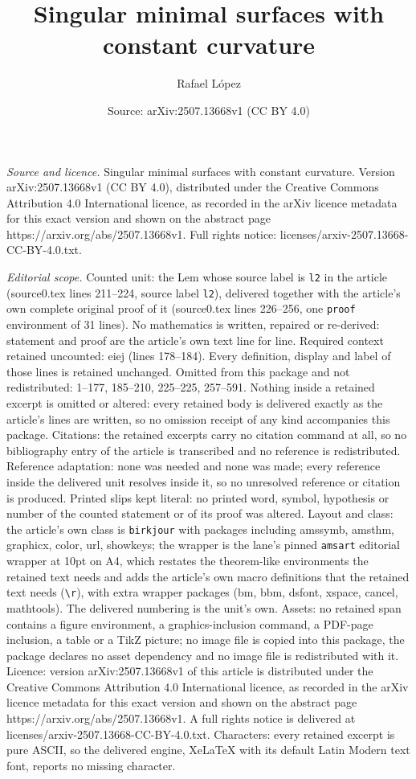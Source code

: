 \documentclass[10pt,a4paper]{amsart}
\title[Singular minimal surfaces with constant curvature]{Singular minimal surfaces with constant curvature}
\author{Rafael L\'opez}
\date{Source: arXiv:2507.13668v1 (CC BY 4.0)}
\begin{document}
\maketitle

\noindent\emph{Source and licence.} Singular minimal surfaces with constant curvature. Version arXiv:2507.13668v1 (CC BY 4.0), distributed under the Creative Commons Attribution 4.0 International licence, as recorded in the arXiv licence metadata for this exact version and shown on the abstract page https://arxiv.org/abs/2507.13668v1. Full rights notice: licenses/arxiv-2507.13668-CC-BY-4.0.txt.\par\smallskip

\noindent\textit{Editorial scope.} Counted unit: the Lem whose source label is \texttt{l2} in the article (source0.tex lines 211--224, source label \texttt{l2}), delivered together with the article's own complete original proof of it (source0.tex lines 226--256, one \texttt{proof} environment of 31 lines). No mathematics is written, repaired or re-derived: statement and proof are the article's own text line for line. Required context retained uncounted: eiej (lines 178--184). Every definition, display and label of those lines is retained unchanged. Omitted from this package and not redistributed: 1--177, 185--210, 225--225, 257--591. Nothing inside a retained excerpt is omitted or altered: every retained body is delivered exactly as the article's lines are written, so no omission receipt of any kind accompanies this package. Citations: the retained excerpts carry no citation command at all, so no bibliography entry of the article is transcribed and no reference is redistributed. Reference adaptation: none was needed and none was made; every reference inside the delivered unit resolves inside it, so no unresolved reference or citation is produced. Printed slips kept literal: no printed word, symbol, hypothesis or number of the counted statement or of its proof was altered. Layout and class: the article's own class is \texttt{birkjour} with packages including amssymb, amsthm, graphicx, color, url, showkeys; the wrapper is the lane's pinned \texttt{amsart} editorial wrapper at 10pt on A4, which restates the theorem-like environments the retained text needs and adds the article's own macro definitions that the retained text needs (\texttt{\textbackslash r}), with extra wrapper packages (bm, bbm, dsfont, xspace, cancel, mathtools). The delivered numbering is the unit's own. Assets: no retained span contains a figure environment, a graphics-inclusion command, a PDF-page inclusion, a table or a TikZ picture; no image file is copied into this package, the package declares no asset dependency and no image file is redistributed with it. Licence: version arXiv:2507.13668v1 of this article is distributed under the Creative Commons Attribution 4.0 International licence, as recorded in the arXiv licence metadata for this exact version and shown on the abstract page https://arxiv.org/abs/2507.13668v1. A full rights notice is delivered at licenses/arxiv-2507.13668-CC-BY-4.0.txt. Characters: every retained excerpt is pure ASCII, so the delivered engine, XeLaTeX with its default Latin Modern text font, reports no missing character.
\end{document}

